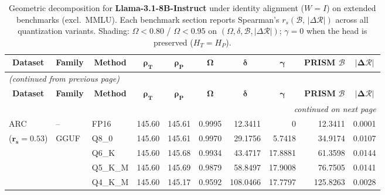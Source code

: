 \begingroup
\small
\setlength{\tabcolsep}{4pt}
\renewcommand{\arraystretch}{1.05}
\setlength{\LTcapwidth}{\textwidth}
\begin{longtable}{ll l rrrrrrr}
\caption{Geometric decomposition for \textbf{Llama-3.1-8B-Instruct} under identity alignment ($W{=}I$) on extended benchmarks (excl.\ MMLU). Each benchmark section reports Spearman's $r_s(\mathcal{B},\,|\Delta\mathcal{R}|)$ across all quantization variants. Shading: \colorbox{red!35}{$\Omega{<}0.80$} / \colorbox{red!18}{$\Omega{<}0.95$} on $(\Omega,\delta,\mathcal{B},|\Delta\mathcal{R}|)$; \colorbox{cyan!12}{$\gamma{=}0$} when the head is preserved ($H_T{=}H_P$).}\label{tab:llama_instruct_decomposition_ext_bound}\\
\toprule
\multicolumn{1}{c}{\textbf{Dataset}} & \multicolumn{1}{c}{\textbf{Family}} & \multicolumn{1}{c}{\textbf{Method}} & \multicolumn{1}{c}{$\boldsymbol{\rho_T}$} & \multicolumn{1}{c}{$\boldsymbol{\rho_P}$} & \multicolumn{1}{c}{$\boldsymbol{\Omega}$} & \multicolumn{1}{c}{$\boldsymbol{\delta}$} & \multicolumn{1}{c}{$\boldsymbol{\gamma}$} & \multicolumn{1}{c}{\textbf{PRISM} $\boldsymbol{\mathcal{B}}$} & \multicolumn{1}{c}{$\boldsymbol{|\Delta\mathcal{R}|}$} \\
\midrule
\endfirsthead
\multicolumn{10}{l}{\small\itshape (continued from previous page)}\\
\toprule
\multicolumn{1}{c}{\textbf{Dataset}} & \multicolumn{1}{c}{\textbf{Family}} & \multicolumn{1}{c}{\textbf{Method}} & \multicolumn{1}{c}{$\boldsymbol{\rho_T}$} & \multicolumn{1}{c}{$\boldsymbol{\rho_P}$} & \multicolumn{1}{c}{$\boldsymbol{\Omega}$} & \multicolumn{1}{c}{$\boldsymbol{\delta}$} & \multicolumn{1}{c}{$\boldsymbol{\gamma}$} & \multicolumn{1}{c}{\textbf{PRISM} $\boldsymbol{\mathcal{B}}$} & \multicolumn{1}{c}{$\boldsymbol{|\Delta\mathcal{R}|}$} \\
\midrule
\endhead
\midrule
\multicolumn{10}{r}{\small\itshape continued on next page}\\
\endfoot
\bottomrule
\endlastfoot
ARC & -- & FP16 & 145.60 & 145.61 & 0.9995 & 12.3411 & \cellcolor{cyan!12} $0$ & 12.3411 & 0.0001 \\
{\small ($\mathbf{r_s{=}0.53}$)} & GGUF & Q8\_0 & 145.60 & 145.61 & 0.9970 & 29.1756 & 5.7418 & 34.9174 & 0.0107 \\
 &  & Q6\_K & 145.60 & 145.68 & 0.9934 & 43.4717 & 17.8881 & 61.3598 & 0.0144 \\
 &  & Q5\_K\_M & 145.60 & 145.69 & 0.9879 & 58.8497 & 17.9008 & 76.7505 & 0.0141 \\
 &  & Q4\_K\_M & 145.60 & 145.17 & 0.9592 & 108.0466 & 17.7797 & 125.8263 & 0.0028 \\

\end{longtable}
